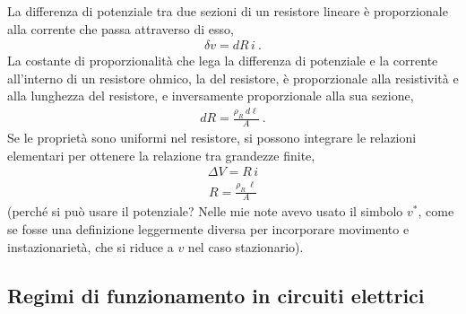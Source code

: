 \documentclass[letterpaper,10pt,italian]{jupyterBook}
\begin{document}
\sphinxAtStartPar
{} La differenza di potenziale tra due sezioni di un resistore lineare è proporzionale alla corrente che passa attraverso di esso,
\begin{equation*}
\begin{split}\delta v = dR \, i \ .\end{split}
\end{equation*}
\sphinxAtStartPar
{} La costante di proporzionalità che lega la differenza di potenziale e la corrente all’interno di un resistore ohmico, la  del resistore, è proporzionale alla resistività e alla lunghezza del resistore, e inversamente proporzionale alla sua sezione,
\begin{equation*}
\begin{split}dR = \frac{\rho_R \ d\ell}{A} \ .\end{split}
\end{equation*}
\sphinxAtStartPar
Se le proprietà sono uniformi nel resistore, si possono integrare le relazioni elementari per ottenere la relazione tra grandezze finite,
\begin{equation*}
\begin{split}\Delta V = R \, i \end{split}
\end{equation*}\begin{equation*}
\begin{split}R = \frac{\rho_R \ \ell}{A}\end{split}
\end{equation*}
\sphinxAtStartPar
{} (perché si può usare il potenziale? Nelle mie note avevo usato il simbolo \(v^*\), come se fosse una definizione leggermente diversa per incorporare movimento e instazionarietà, che si riduce a \(v\) nel caso stazionario).

\sphinxAtStartPar
{}

\sphinxAtStartPar
{}

\sphinxAtStartPar
{}

\sphinxAtStartPar
{}

\sphinxstepscope




\subsection{Regimi di funzionamento in circuiti elettrici}
\label{\detokenize{ch/circuits-electric-regimes:regimi-di-funzionamento-in-circuiti-elettrici}}\label{\detokenize{ch/circuits-electric-regimes:classical-electromagnetism-circuits-electric-regimes}}\label{\detokenize{ch/circuits-electric-regimes::doc}}
\sphinxstepscope
\end{document}

